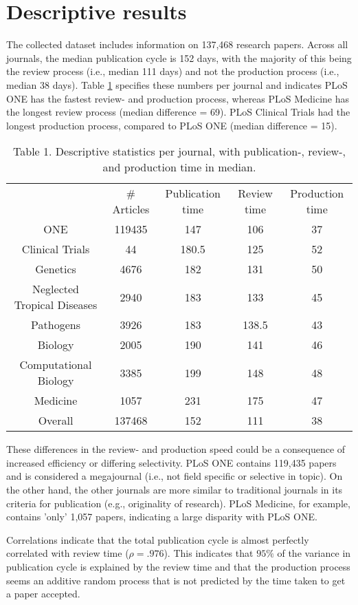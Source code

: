 \section*{Descriptive results}
The collected dataset includes information on 137,468 research papers. Across all journals, the median publication cycle is 152 days, with the majority of this being the review process (i.e., median 111 days) and not the production process (i.e., median 38 days). Table \ref{tab:tab1} specifies these numbers per journal and indicates PLoS ONE has the fastest review- and production process, whereas PLoS Medicine has the longest review process (median difference = 69). PLoS Clinical Trials had the longest production process, compared to PLoS ONE (median difference = 15).

\begin{table}
\caption{Table 1. Descriptive statistics per journal, with publication-, review-, and production time in median.}
\label{tab:tab1}
\begin{tabular}{ c c c c c }
          & \# Articles & Publication time & Review time & Production time \\
    ONE   & 119435 & 147   & 106   & 37 \\
    Clinical Trials & 44    & 180.5 & 125   & 52 \\
    Genetics & 4676  & 182   & 131   & 50 \\
    Neglected Tropical Diseases & 2940  & 183   & 133   & 45 \\
    Pathogens & 3926  & 183   & 138.5 & 43 \\
    Biology & 2005  & 190   & 141   & 46 \\
    Computational Biology & 3385  & 199   & 148   & 48 \\
    Medicine & 1057  & 231   & 175   & 47 \\
    Overall & 137468 & 152   & 111   & 38 \\
\end{tabular}
\end{table}

These differences in the review- and production speed could be a consequence of increased efficiency or differing selectivity. PLoS ONE contains 119,435 papers and is considered a megajournal (i.e., not field specific or selective in topic). On the other hand, the other journals are more similar to traditional journals in its criteria for publication (e.g., originality of research). PLoS Medicine, for example, contains 'only' 1,057 papers, indicating a large disparity with PLoS ONE. 

Correlations indicate that the total publication cycle is almost perfectly correlated with review time ($\rho=.976$). This indicates that $95\%$ of the variance in publication cycle is explained by the review time and that the production process seems an additive random process that is not predicted by the time taken to get a paper accepted.